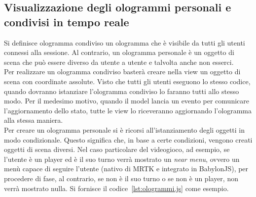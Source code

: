 \subsection{Visualizzazione degli ologrammi personali e condivisi in tempo reale}
Si definisce ologramma condiviso un ologramma che è visibile da tutti gli utenti connessi alla sessione. Al contrario, un ologramma personale è un oggetto di scena che può essere diverso
da utente a utente e talvolta anche non esserci.\\
Per realizzare un ologramma condiviso basterà creare nella view un oggetto di scena con coordinate assolute. Visto che tutti gli utenti eseguono lo stesso codice, quando
dovranno istanziare l'ologramma condiviso lo faranno tutti allo stesso modo. Per il medesimo motivo, quando il model lancia un evento per comunicare l'aggiornamento dello stato, tutte le 
view lo riceveranno aggiornando l'ologramma alla stessa maniera.\\
Per creare un ologramma personale si è ricorsi all'istanziamento degli oggetti in modo condizionale. Questo significa che, in base a certe condizioni, vengono creati oggetti di scena 
diversi. Nel caso particolare del videogioco, ad esempio, se l'utente è un player ed è il suo turno verrà mostrato un
\textit{near menu}, ovvero un menù capace di seguire l'utente (nativo di MRTK e integrato in BabylonJS), per procedere di fase, al contrario, se non è il suo turno o se non è un
player, non verrà mostrato nulla. Si fornisce il codice~\ref{lst:ologrammi.js} come esempio. 

